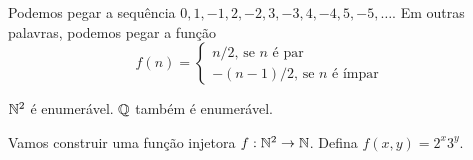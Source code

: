 \documentclass[10pt, a4paper]{article}
\begin{document}
	\begin{dem}
		Podemos pegar a sequência $0, 1, -1, 2, -2, 3, -3, 4, -4, 5, -5, \dots$.
		Em outras palavras, podemos pegar a função
		\[f(n) = \begin{cases} n/2\text{, se $n$ é par} \\ -(n-1)/2\text{, se $n$ é ímpar}\end{cases}\]

	\end{dem}

	\begin{lem}
		$\mathbb{N}^2$ é enumerável. $\mathbb{Q}$ também é enumerável.
	\end{lem}

	\begin{dem}
		Vamos construir uma função injetora $f: \mathbb{N}^2 \to \mathbb{N}$. Defina $f(x, y) = 2^x3^y$.
	\end{dem}
\end{document}
